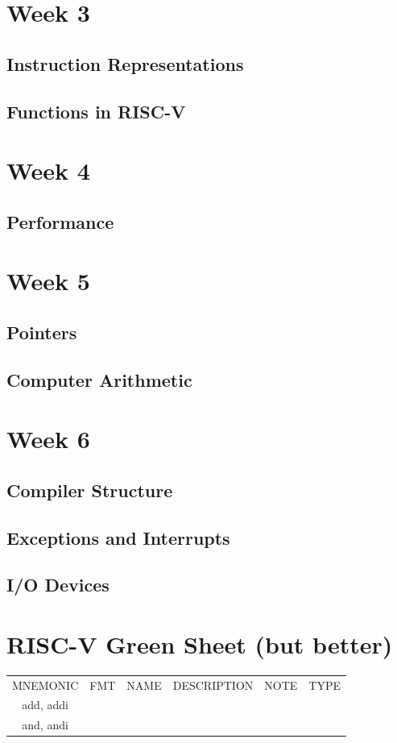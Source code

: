 \documentclass{article}
\begin{document}
\section{Week 3}
\subsection{Instruction Representations}
\subsection{Functions in RISC-V}
\section{Week 4}
\subsection{Performance}
\section{Week 5}
\subsection{Pointers}
\subsection{Computer Arithmetic}
\section{Week 6}
\subsection{Compiler Structure}
\subsection{Exceptions and Interrupts}
\subsection{I/O Devices}


\newpage 
\section{RISC-V Green Sheet (but better)}
\begin{tabular}{c|c|c|c|c|c}
		MNEMONIC & FMT & NAME & DESCRIPTION & NOTE & TYPE\\
		add, addi & \\
		and, andi
	\end{tabular}
	
	
\end{document}
